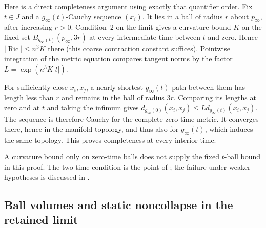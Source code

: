 Here is a direct completeness argument using exactly that quantifier
order.  Fix $t\in J$ and a $g_\infty(t)$-Cauchy sequence $(x_i)$.
It lies in a ball of radius $r$ about $p_\infty$, after increasing
$r>0$.  Condition~2 on the limit gives a curvature bound $K$ on the
fixed set $B_{g_\infty(t)}(p_\infty,3r)$ at every intermediate time
between $t$ and zero.  Hence $|\operatorname{Ric}|\leq n^3K$ there
(this coarse contraction constant suffices).  Pointwise integration
of the metric equation compares tangent norms by the factor
$L=\exp(n^3K|t|)$.

For sufficiently close $x_i,x_j$, a nearly shortest $g_\infty(t)$-path
between them has length less than $r$ and remains in the ball of
radius $3r$.  Comparing its lengths at zero and at $t$ and taking
the infimum gives
$d_{g_\infty(0)}(x_i,x_j)\leq Ld_{g_\infty(t)}(x_i,x_j)$.
The sequence is therefore Cauchy for the complete zero-time metric.
It converges there, hence in the manifold topology, and thus also
for $g_\infty(t)$, which induces the same topology.  This proves
completeness at every interior time.

A curvature bound only on zero-time balls does not supply the fixed
$t$-ball bound in this proof.  The two-time condition is the point of
\cite[Theorem 1.7, p.~179]{Topping2014}; the failure under weaker
hypotheses is discussed in \cite[Theorem 1.3 and Corollary 1.4,
pp.~176--177]{Topping2014}.

\subsection{Ball volumes and static noncollapse in the retained limit}

